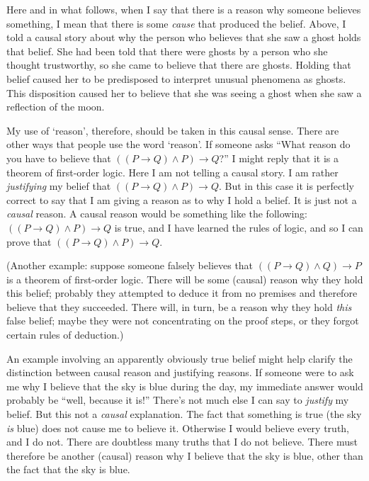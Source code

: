 \documentclass[11pt]{article}
\begin{document}
\begin{spacing}{1.5}
Here and in what follows, when I say that there is a reason why
someone believes something, I mean that there is some {\em cause} that
produced the belief.  Above, I told a causal story about why the
person who believes that she saw a ghost holds that belief.  She had
been told that there were ghosts by a person who she thought
trustworthy, so she came to believe that there are ghosts.  Holding
that belief caused her to be predisposed to interpret unusual
phenomena as ghosts.  This disposition caused her to believe that she
was seeing a ghost when she saw a reflection of the moon.

My use of `reason', therefore, should be taken in this causal sense.
There are other ways that people use the word `reason'.  If someone
asks ``What reason do you have to believe that $((P \rightarrow Q )
\wedge P) \rightarrow Q$?''  I might reply that it is a theorem of
first-order logic.  Here I am not telling a causal story.  I am rather
{\em justifying} my belief that $((P \rightarrow Q ) \wedge P)
\rightarrow Q$.  But in this case it is perfectly correct to say that
I am giving a reason as to why I hold a belief.  It is just not a {\em
  causal} reason.  A causal reason would be something like the
following: $((P \rightarrow Q ) \wedge P) \rightarrow Q$ is true, and
I have learned the rules of logic, and so I can prove that $((P
\rightarrow Q ) \wedge P) \rightarrow Q$.

(Another example: suppose someone falsely believes that $((P
\rightarrow Q ) \wedge Q) \rightarrow P$ is a theorem of first-order
logic.  There will be some (causal) reason why they hold this belief;
probably they attempted to deduce it from no premises and therefore
believe that they succeeded.  There will, in turn, be a reason why
they hold {\em this} false belief; maybe they were not concentrating
on the proof steps, or they forgot certain rules of deduction.)

An example involving an apparently obviously true belief might help
clarify the distinction between causal reason and justifying reasons.
If someone were to ask me why I believe that the sky is blue during
the day, my immediate answer would probably be ``well, because it
is!''  There's not much else I can say to {\em justify} my belief.
But this not a {\em causal} explanation.  The fact that something is
true (the sky {\em is} blue) does not cause me to believe it.
Otherwise I would believe every truth, and I do not.  There are
doubtless many truths that I do not believe.  There must therefore be
another (causal) reason why I believe that the sky is blue, other than
the fact that the sky is blue.


\end{spacing}
\end{document}

